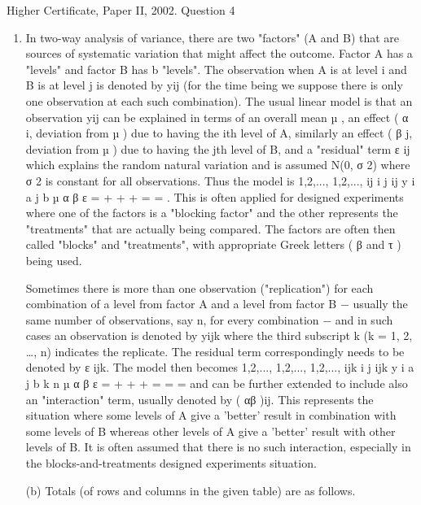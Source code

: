 \documentclass[a4paper,12pt]{article}
\begin{document}
Higher Certificate, Paper II, 2002.  Question 4 
 
\begin{enumerate} 
\item  


In two-way analysis of variance, there are two "factors" (A and B) that are sources of systematic variation that might affect the outcome.  Factor A has a "levels" and factor B has b "levels".  The observation when A is at level i and B is at level j is denoted by yij (for the time being we suppose there is only one observation at each such combination).  The usual linear model is that an observation yij can be explained in terms of an overall mean µ , an effect ( α i, deviation from µ ) due to having the ith level of A, similarly an effect ( β j, deviation from µ ) due to having the jth level of B, and a "residual" term ε ij which explains the random natural variation and is assumed N(0, σ 2) where σ 2 is constant for all observations.  Thus the model is 
  1,2,..., 1,2,..., ij i j ij y i a j b µ α β ε = + + + = = . This is often applied for designed experiments where one of the factors is a "blocking factor" and the other represents the "treatments" that are actually being compared.  The factors are often then called "blocks" and "treatments", with appropriate Greek letters ( β and τ ) being used. 
 
 Sometimes there is more than one observation ("replication") for each combination of a level from factor A and a level from factor B  −  usually the same number of observations, say n, for every combination  −  and in such cases an observation is denoted by yijk where the third subscript k (k = 1, 2, …, n) indicates the replicate.  The residual term correspondingly needs to be denoted by ε ijk.  The model then becomes 
  1,2,..., 1,2,..., 1,2,..., ijk i j ijk y i a j b k n µ α β ε = + + + = = = and can be further extended to include also an "interaction" term, usually denoted by ( αβ )ij.  This represents the situation where some levels of A give a 'better' result in combination with some levels of B whereas other levels of A give a 'better' result with other levels of B.  It is often assumed that there is no such interaction, especially in the blocks-and-treatments designed experiments situation. 
 
 
(b) Totals (of rows and columns in the given table) are as follows. 
 

\end{enumerate}
\end{document}
